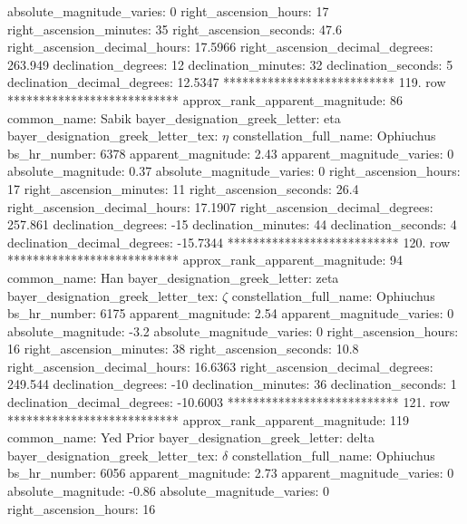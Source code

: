          absolute_magnitude_varies: 0
             right_ascension_hours: 17
           right_ascension_minutes: 35
           right_ascension_seconds: 47.6
     right_ascension_decimal_hours: 17.5966
   right_ascension_decimal_degrees: 263.949
               declination_degrees: 12
               declination_minutes: 32
               declination_seconds: 5
       declination_decimal_degrees: 12.5347
*************************** 119. row ***************************
    approx_rank_apparent_magnitude: 86
                       common_name: Sabik
    bayer_designation_greek_letter: eta
bayer_designation_greek_letter_tex: $\eta$
           constellation_full_name: Ophiuchus
                      bs_hr_number: 6378
                apparent_magnitude: 2.43
         apparent_magnitude_varies: 0
                absolute_magnitude: 0.37
         absolute_magnitude_varies: 0
             right_ascension_hours: 17
           right_ascension_minutes: 11
           right_ascension_seconds: 26.4
     right_ascension_decimal_hours: 17.1907
   right_ascension_decimal_degrees: 257.861
               declination_degrees: -15
               declination_minutes: 44
               declination_seconds: 4
       declination_decimal_degrees: -15.7344
*************************** 120. row ***************************
    approx_rank_apparent_magnitude: 94
                       common_name: Han
    bayer_designation_greek_letter: zeta
bayer_designation_greek_letter_tex: $\zeta$
           constellation_full_name: Ophiuchus
                      bs_hr_number: 6175
                apparent_magnitude: 2.54
         apparent_magnitude_varies: 0
                absolute_magnitude: -3.2
         absolute_magnitude_varies: 0
             right_ascension_hours: 16
           right_ascension_minutes: 38
           right_ascension_seconds: 10.8
     right_ascension_decimal_hours: 16.6363
   right_ascension_decimal_degrees: 249.544
               declination_degrees: -10
               declination_minutes: 36
               declination_seconds: 1
       declination_decimal_degrees: -10.6003
*************************** 121. row ***************************
    approx_rank_apparent_magnitude: 119
                       common_name: Yed Prior
    bayer_designation_greek_letter: delta
bayer_designation_greek_letter_tex: $\delta$
           constellation_full_name: Ophiuchus
                      bs_hr_number: 6056
                apparent_magnitude: 2.73
         apparent_magnitude_varies: 0
                absolute_magnitude: -0.86
         absolute_magnitude_varies: 0
             right_ascension_hours: 16
